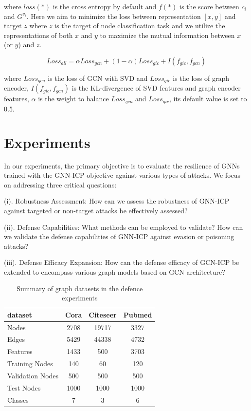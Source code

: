 \documentclass[conference]{IEEEtran}
\begin{document}
where $loss(*)$ is the cross entropy by default and $f(*)$ is the score between $c_i$ and $G^{v_i}$. Here we aim to minimize the loss between representation $[x,y]$ and target $z$ where $z$ is the target of node classification task and we utilize the representations of both $x$ and $y$ to maximize the mutual information between $x$ (or $y$) and $z$.

\begin{equation}
 Loss_{all}= \alpha Loss_{gcn}+(1-\alpha)Loss_{gic}+I(f_{gic},f_{gcn})   
\end{equation}


where $Loss_{gcn}$ is the loss of GCN with SVD and $Loss_{gic}$ is the loss of graph encoder, $I(f_{gic},f_{gcn})$ is the KL-divergence of SVD features and graph encoder features, $\alpha$ is the weight to balance $Loss_{gcn}$ and $Loss_{gic}$, its default value is set to 0.5.


\section{Experiments}

In our experiments, the primary objective is to evaluate the resilience of GNNs trained with the GNN-ICP objective against various types of attacks. We focus on addressing three critical questions:

(i). Robustness Assessment: How can we assess the robustness of GNN-ICP against targeted or non-target attacks be effectively assessed?

(ii). Defense Capabilities: What methods can be employed to validate? How can we validate the defense capabilities of GNN-ICP against evasion or poisoning attacks?

(iii). Defense Efficacy Expansion: How can the defense efficacy of GCN-ICP  be extended to encompass various graph models based on GCN architecture?

\begin{table}[htbp]
  \centering
  \caption{Summary of graph datasets in the defence experiments}
    \begin{tabular}{|l|ccc|}
    \hline
    dataset & \multicolumn{1}{l}{Cora} & \multicolumn{1}{l}{Citeseer} & \multicolumn{1}{l|}{Pubmed} \\
    \hline
    Nodes & 2708  & 19717 & 3327 \\
    Edges & 5429  & 44338 & 4732 \\
    Features & 1433  & 500   & 3703 \\
    Training Nodes & 140   & 60    & 120 \\
    Validation Nodes & 500   & 500   & 500 \\
    Test Nodes & 1000  & 1000  & 1000 \\
    Classes & 7     & 3     & 6 \\
    \hline
    \end{tabular}%
  \label{tab:summary-of-graph-datasets}%
\end{table}%
\end{document}
